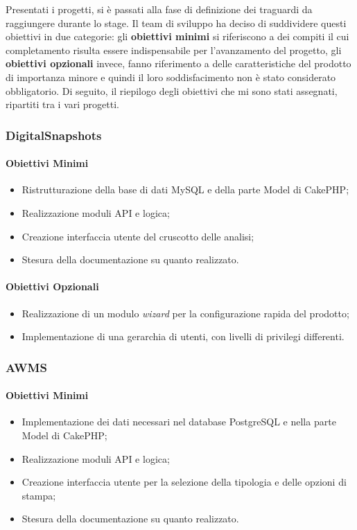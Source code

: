 Presentati i progetti, si è passati alla fase di definizione dei traguardi da raggiungere durante lo stage.
Il team di sviluppo ha deciso di suddividere questi obiettivi in due categorie: gli \textbf{obiettivi minimi} si riferiscono a dei compiti il cui completamento risulta essere indispensabile per l'avanzamento del progetto, gli \textbf{obiettivi opzionali} invece, fanno riferimento a delle caratteristiche del prodotto di importanza minore e quindi il loro soddisfacimento non è stato considerato obbligatorio.
Di seguito, il riepilogo degli obiettivi che mi sono stati assegnati, ripartiti tra i vari progetti.

\subsubsection*{DigitalSnapshots}
\paragraph*{Obiettivi Minimi}
\begin{itemize}
\item Ristrutturazione della base di dati MySQL e della parte Model di CakePHP;
\item Realizzazione moduli API e logica;
\item Creazione interfaccia utente del cruscotto delle analisi; 
\item Stesura della documentazione su quanto realizzato.
\end{itemize}

\paragraph*{Obiettivi Opzionali}
\begin{itemize}
\item Realizzazione di un modulo \textit{wizard} per la configurazione rapida del prodotto;
\item Implementazione di una gerarchia di utenti, con livelli di privilegi differenti.
\end{itemize}

\subsubsection*{AWMS}
\paragraph*{Obiettivi Minimi}
\begin{itemize}
\item Implementazione dei dati necessari nel database PostgreSQL e nella parte Model di CakePHP;
\item Realizzazione moduli API e logica;
\item Creazione interfaccia utente per la selezione della tipologia e delle opzioni di stampa; 
\item Stesura della documentazione su quanto realizzato.
\end{itemize}


